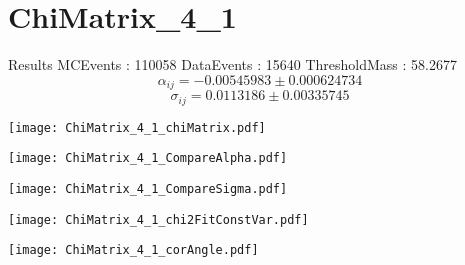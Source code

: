 \documentclass[a4paper,12pt]{article}
\begin{document}
\section{ChiMatrix\_4\_1}
\begin{minipage}{0.49\linewidth} Results \newline
MCEvents : 110058\newline
DataEvents : 15640 \newline
ThresholdMass : 58.2677\\
$$\alpha_{ij} = -0.00545983\pm 0.000624734$$
$$\sigma_{ij} = 0.0113186\pm 0.00335745$$
\end{minipage}\hfill
\begin{minipage}{0.49\linewidth} 
\texttt{[image: ChiMatrix\_4\_1\_chiMatrix.pdf]}\\
\end{minipage}
\hfill
\begin{minipage}{0.49\linewidth} 
\texttt{[image: ChiMatrix\_4\_1\_CompareAlpha.pdf]}\\
\end{minipage}
\hfill
\begin{minipage}{0.49\linewidth} 
\texttt{[image: ChiMatrix\_4\_1\_CompareSigma.pdf]}\\
\end{minipage}
\begin{minipage}{0.49\linewidth} 
\texttt{[image: ChiMatrix\_4\_1\_chi2FitConstVar.pdf]}\\
\end{minipage}
\hfill
\begin{minipage}{0.49\linewidth} 
\texttt{[image: ChiMatrix\_4\_1\_corAngle.pdf]}\\
\end{minipage}
\end{document}
